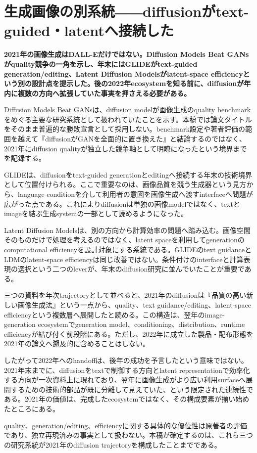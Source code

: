 \section{生成画像の別系統――diffusionがtext-guided・latentへ接続した}
\noindent\textbf{2021年の画像生成はDALL-Eだけではない。Diffusion Models Beat GANsがquality競争の一角を示し、年末にはGLIDEがtext-guided generation/editing、Latent Diffusion Modelsがlatent-space efficiencyという別の設計点を提示した。後の2022年ecosystemを知る前に、diffusionが年内に複数の方向へ拡張していた事実を押さえる必要がある。}\autocite{src-11a149a699a0,src-50244427230b,src-a4561c635fe6}

Diffusion Models Beat GANsは、diffusion modelが画像生成のquality benchmarkをめぐる主要な研究系統として扱われていたことを示す。本稿では論文タイトルをそのまま普遍的な勝敗宣言として採用しない。benchmark設定や著者評価の範囲を越えて『diffusionがGANを全面的に置き換えた』と結論するのではなく、2021年にdiffusion qualityが独立した競争軸として明瞭になったという境界までを記録する。\autocite{src-11a149a699a0}


GLIDEは、diffusionをtext-guided generationとeditingへ接続する年末の技術境界として位置付けられる。ここで重要なのは、画像品質を競う生成器という見方から、language conditionを介して利用者の意図を画像生成へ渡すinterfaceへ問題が広がった点である。これによりdiffusionは単独の画像modelではなく、textとimageを結ぶ生成systemの一部として読めるようになった。\autocite{src-50244427230b}


Latent Diffusion Modelsは、別の方向から計算効率の問題へ踏み込む。画像空間そのものだけで処理を考えるのではなく、latent spaceを利用してgenerationのcomputational efficiencyを設計対象にする系統である。GLIDEのtext guidanceとLDMのlatent-space efficiencyは同じ改善ではない。条件付けのinterfaceと計算表現の選択という二つのleverが、年末のdiffusion研究に並んでいたことが重要である。\autocite{src-a4561c635fe6}


三つの資料を年次trajectoryとして並べると、2021年のdiffusionは『品質の高い新しい画像生成法』という一点から、quality、text guidance/editing、latent-space efficiencyという複数層へ展開したと読める。この構造は、翌年のimage-generation ecosystemでgeneration model、conditioning、distribution、runtime efficiencyが結び付く前段階にある。ただし、2022年に成立した製品・配布形態を2021年の論文へ遡及的に含めることはしない。\autocite{src-11a149a699a0,src-50244427230b,src-a4561c635fe6}


したがって2022年へのhandoffは、後年の成功を予言したという意味ではない。2021年末までに、diffusionをtextで制御する方向とlatent representationで効率化する方向が一次資料上に現れており、翌年に画像生成がより広い利用surfaceへ展開するための技術的部品が既に分離して見えていた、という限定された連続性である。2021年の価値は、完成したecosystemではなく、その構成要素が揃い始めたところにある。\autocite{src-50244427230b,src-a4561c635fe6}


\begin{claimboundary}
quality、generation/editing、efficiencyに関する具体的な優位性は原著者の評価であり、独立再現済みの事実として扱わない。本稿が確定するのは、これら三つの研究系統が2021年のdiffusion trajectoryを構成したことまでである。\autocite{src-11a149a699a0,src-50244427230b,src-a4561c635fe6}
\end{claimboundary}
